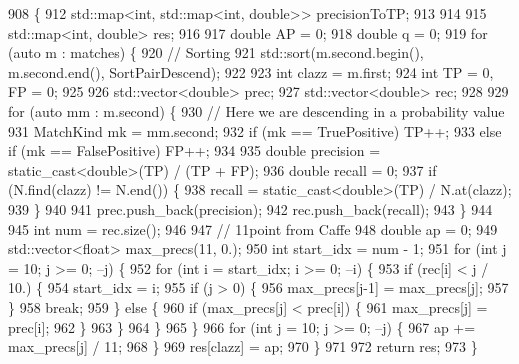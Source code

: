 \begin{DoxyCode}
908                                                                   \{
912         std::map<int, std::map<int, double>> precisionToTP;
913 
914 
915         std::map<int, double> res;
916 
917         \textcolor{keywordtype}{double} AP = 0;
918         \textcolor{keywordtype}{double} q = 0;
919         \textcolor{keywordflow}{for} (\textcolor{keyword}{auto} m : matches) \{
920             \textcolor{comment}{// Sorting}
921             std::sort(m.second.begin(), m.second.end(), SortPairDescend);
922 
923             \textcolor{keywordtype}{int} clazz = m.first;
924             \textcolor{keywordtype}{int} TP = 0, FP = 0;
925 
926             std::vector<double> prec;
927             std::vector<double> rec;
928 
929             \textcolor{keywordflow}{for} (\textcolor{keyword}{auto} mm : m.second) \{
930                 \textcolor{comment}{// Here we are descending in a probability value}
931                 MatchKind mk = mm.second;
932                 \textcolor{keywordflow}{if} (mk == TruePositive) TP++;
933                 \textcolor{keywordflow}{else} \textcolor{keywordflow}{if} (mk == FalsePositive) FP++;
934 
935                 \textcolor{keywordtype}{double} precision = \textcolor{keyword}{static\_cast<}\textcolor{keywordtype}{double}\textcolor{keyword}{>}(TP) / (TP + FP);
936                 \textcolor{keywordtype}{double} recall = 0;
937                 \textcolor{keywordflow}{if} (N.find(clazz) != N.end()) \{
938                     recall = \textcolor{keyword}{static\_cast<}\textcolor{keywordtype}{double}\textcolor{keyword}{>}(TP) / N.at(clazz);
939                 \}
940 
941                 prec.push\_back(precision);
942                 rec.push\_back(recall);
943             \}
944 
945             \textcolor{keywordtype}{int} num = rec.size();
946 
947             \textcolor{comment}{// 11point from Caffe}
948             \textcolor{keywordtype}{double} ap = 0;
949             std::vector<float> max\_precs(11, 0.);
950             \textcolor{keywordtype}{int} start\_idx = num - 1;
951             \textcolor{keywordflow}{for} (\textcolor{keywordtype}{int} j = 10; j >= 0; --j) \{
952                 \textcolor{keywordflow}{for} (\textcolor{keywordtype}{int} i = start\_idx; i >= 0; --i) \{
953                     \textcolor{keywordflow}{if} (rec[i] < j / 10.) \{
954                         start\_idx = i;
955                         \textcolor{keywordflow}{if} (j > 0) \{
956                             max\_precs[j-1] = max\_precs[j];
957                         \}
958                         \textcolor{keywordflow}{break};
959                     \} \textcolor{keywordflow}{else} \{
960                         \textcolor{keywordflow}{if} (max\_precs[j] < prec[i]) \{
961                             max\_precs[j] = prec[i];
962                         \}
963                     \}
964                 \}
965             \}
966             \textcolor{keywordflow}{for} (\textcolor{keywordtype}{int} j = 10; j >= 0; --j) \{
967                 ap += max\_precs[j] / 11;
968             \}
969             res[clazz] = ap;
970         \}
971 
972         \textcolor{keywordflow}{return} res;
973     \}
\end{DoxyCode}
